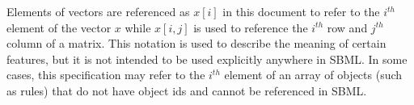 Elements of vectors are referenced as $x[i]$ in this document to refer to the  $i^{th}$ element of the vector $x$ while $x[i,j]$ is used to reference the $i^{th}$ row and $j^{th}$ column of a matrix.
This notation is used to describe the meaning of certain features, but it is not intended to be used explicitly anywhere in SBML. 
In some cases, this specification may refer to the $i^{th}$ element of an array of objects (such as rules) that do not have object ids and cannot be referenced in SBML. 



